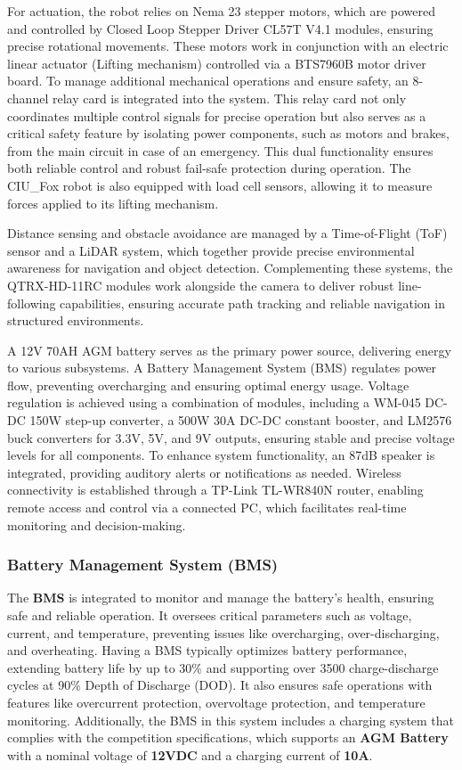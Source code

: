 \documentclass[../../main]{subfiles}
\begin{document}
For actuation, the robot relies on Nema 23 stepper motors, which are powered and controlled 
by Closed Loop Stepper Driver CL57T V4.1 modules, ensuring precise rotational movements. 
These motors work in conjunction with an electric linear actuator (Lifting mechanism) controlled via a BTS7960B 
motor driver board. To manage additional mechanical operations and ensure safety, an 8-channel relay card is integrated into the system. 
This relay card not only coordinates multiple control signals for precise operation but also serves as a critical safety feature by isolating 
power components, such as motors and brakes, from the main circuit in case of an emergency. This dual functionality ensures both reliable control 
and robust fail-safe protection during operation. The CIU\_Fox robot is also equipped with load cell sensors, allowing it to measure 
forces applied to its lifting mechanism. 

Distance sensing and obstacle avoidance are managed by a Time-of-Flight (ToF) sensor and a LiDAR system, which together provide precise environmental 
awareness for navigation and object detection. Complementing these systems, the QTRX-HD-11RC modules work alongside the camera to deliver robust 
line-following capabilities, ensuring accurate path tracking and reliable navigation in structured environments.

A 12V 70AH AGM battery serves as the primary power source, 
delivering energy to various subsystems. A Battery Management 
System (BMS) regulates power flow, preventing overcharging 
and ensuring optimal energy usage. Voltage regulation is 
achieved using a combination of modules, including a WM-045 
DC-DC 150W step-up converter, a 500W 30A DC-DC constant 
booster, and LM2576 buck converters for 3.3V, 5V, and 9V 
outputs, ensuring stable and precise voltage levels for all 
components. To enhance system functionality, an 87dB speaker 
is integrated, providing auditory alerts or notifications as 
needed. Wireless connectivity is established through a 
TP-Link TL-WR840N router, enabling remote access and control 
via a connected PC, which facilitates real-time monitoring 
and decision-making.

\subsubsection{Battery Management System (BMS)}

The \textbf{BMS} is integrated to monitor and manage the battery's health, 
ensuring safe and reliable operation. It oversees critical parameters such as voltage, current, and temperature,
preventing issues like overcharging, over-discharging, and overheating. Having a BMS typically optimizes battery performance, 
extending battery life by up to 30\% and supporting over 3500 charge-discharge cycles at 90\% Depth of Discharge (DOD). 
It also ensures safe operations with features like overcurrent protection, overvoltage protection, and temperature monitoring. 
Additionally, the BMS in this system includes a charging system that complies with the competition specifications, 
which supports an \textbf{AGM Battery} with a nominal voltage of \textbf{12VDC} and a charging current of \textbf{10A}.
\end{document}
